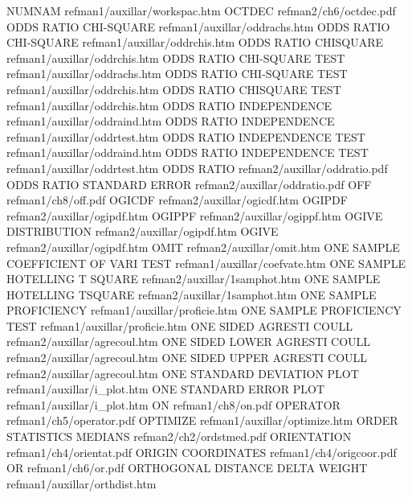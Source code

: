 NUMNAM                                  refman1/auxillar/workspac.htm
OCTDEC                                  refman2/ch6/octdec.pdf
ODDS RATIO CHI-SQUARE                   refman1/auxillar/oddrachs.htm
ODDS RATIO CHI-SQUARE                   refman1/auxillar/oddrchis.htm
ODDS RATIO CHISQUARE                    refman1/auxillar/oddrchis.htm
ODDS RATIO CHI-SQUARE TEST              refman1/auxillar/oddrachs.htm
ODDS RATIO CHI-SQUARE TEST              refman1/auxillar/oddrchis.htm
ODDS RATIO CHISQUARE TEST               refman1/auxillar/oddrchis.htm
ODDS RATIO INDEPENDENCE                 refman1/auxillar/oddraind.htm
ODDS RATIO INDEPENDENCE                 refman1/auxillar/oddrtest.htm
ODDS RATIO INDEPENDENCE TEST            refman1/auxillar/oddraind.htm
ODDS RATIO INDEPENDENCE TEST            refman1/auxillar/oddrtest.htm
ODDS RATIO                              refman2/auxillar/oddratio.pdf
ODDS RATIO STANDARD ERROR               refman2/auxillar/oddratio.pdf
OFF                                     refman1/ch8/off.pdf
OGICDF                                  refman2/auxillar/ogicdf.htm
OGIPDF                                  refman2/auxillar/ogipdf.htm
OGIPPF                                  refman2/auxillar/ogippf.htm
OGIVE DISTRIBUTION                      refman2/auxillar/ogipdf.htm
OGIVE                                   refman2/auxillar/ogipdf.htm
OMIT                                    refman2/auxillar/omit.htm
ONE SAMPLE COEFFICIENT OF VARI TEST     refman1/auxillar/coefvate.htm
ONE SAMPLE HOTELLING T SQUARE           refman2/auxillar/1samphot.htm
ONE SAMPLE HOTELLING TSQUARE            refman2/auxillar/1samphot.htm
ONE SAMPLE PROFICIENCY                  refman1/auxillar/proficie.htm
ONE SAMPLE PROFICIENCY TEST             refman1/auxillar/proficie.htm
ONE SIDED AGRESTI COULL                 refman2/auxillar/agrecoul.htm
ONE SIDED LOWER AGRESTI COULL           refman2/auxillar/agrecoul.htm
ONE SIDED UPPER AGRESTI COULL           refman2/auxillar/agrecoul.htm
ONE STANDARD DEVIATION PLOT             refman1/auxillar/i_plot.htm
ONE STANDARD ERROR PLOT                 refman1/auxillar/i_plot.htm
ON                                      refman1/ch8/on.pdf
OPERATOR                                refman1/ch5/operator.pdf
OPTIMIZE                                refman1/auxillar/optimize.htm
ORDER STATISTICS MEDIANS                refman2/ch2/ordstmed.pdf
ORIENTATION                             refman1/ch4/orientat.pdf
ORIGIN COORDINATES                      refman1/ch4/origcoor.pdf
OR                                      refman1/ch6/or.pdf
ORTHOGONAL DISTANCE DELTA WEIGHT        refman1/auxillar/orthdist.htm
